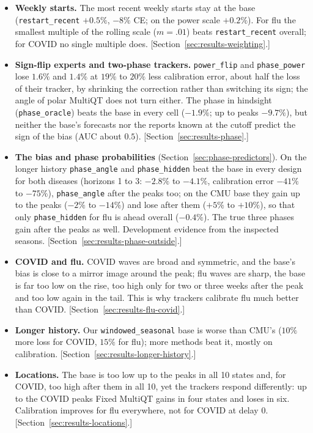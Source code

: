 \documentclass[11pt,a4paper]{article}
\theoremstyle{definition}
\theoremstyle{remark}
\begin{document}
\begin{itemize}[leftmargin=*,itemsep=3pt]
changes sign at the peak (COVID in two thirds of the cases and levels, flu
in $30\%$), which no positive scale undoes. A static threshold never beats
the base; one per phase, with the phase known in hindsight, does for flu
(power scale $-8.7\%$). [Section~\ref{sec:score-stationarity}.]
\item \textbf{Weekly starts.} The most recent weekly starts stay at the base
(\texttt{restart\_recent} $+0.5\%$, $-8\%$ CE; on the power scale
$+0.2\%$). For flu the smallest
multiple of the rolling scale ($m=.01$) beats \texttt{restart\_recent}
overall; for COVID no single multiple does.
[Section~\ref{sec:results-weighting}.]
\item \textbf{Sign-flip experts and two-phase trackers.}
\texttt{power\_flip} and \texttt{phase\_power} lose $1.6\%$ and $1.4\%$
at $19\%$ to $20\%$ less calibration error, about half the loss of their
tracker, by shrinking the correction rather than
switching its sign; the angle of polar MultiQT does not turn either. The
phase in hindsight (\texttt{phase\_oracle}) beats the base in every cell
($-1.9\%$; up to peaks $-9.7\%$), but neither the base's forecasts nor the
reports known at the cutoff predict the sign of the bias (AUC about $0.5$).
[Section~\ref{sec:results-phase}.]
\item \textbf{The bias and phase probabilities}
(Section~\ref{sec:phase-predictors}). On the longer history
\texttt{phase\_angle} and \texttt{phase\_hidden} beat the base in every
design for both diseases (horizons 1 to 3: $-2.8\%$ to $-4.1\%$, calibration
error $-41\%$ to $-75\%$), \texttt{phase\_angle} after the peaks too; on the
CMU base they gain up to the peaks ($-2\%$ to $-14\%$) and lose after them
($+5\%$ to $+10\%$), so that only \texttt{phase\_hidden} for flu is ahead
overall ($-0.4\%$). The true three phases gain after the peaks as well.
Development evidence from the inspected seasons.
[Section~\ref{sec:results-phase-outside}.]
\item \textbf{COVID and flu.} COVID waves are broad and symmetric, and the
base's bias is close to a mirror image around the peak; flu waves are
sharp, the base is far too low on the rise, too high only for two or three
weeks after the peak and too low again in the tail. This is why trackers
calibrate flu much better than COVID. [Section~\ref{sec:results-flu-covid}.]
\item \textbf{Longer history.} Our \texttt{windowed\_seasonal} base is
worse than CMU's ($10\%$ more loss for COVID, $15\%$ for flu); more methods
beat it, mostly on calibration. [Section~\ref{sec:results-longer-history}.]
\item \textbf{Locations.} The base is too low up to the peaks in all 10
states and, for COVID, too high after them in all 10, yet the trackers
respond differently: up to the COVID peaks Fixed MultiQT gains in four
states and loses in six. Calibration improves for flu everywhere, not for
COVID at delay 0. [Section~\ref{sec:results-locations}.]
\end{itemize}
\end{document}
